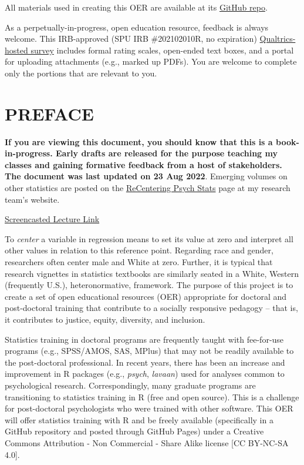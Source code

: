 \documentclass[
  11pt,
]{book}
\begin{document}
All materials used in creating this OER are available at its \href{https://github.com/lhbikos/ReCenterPsychStats}{GitHub repo}.

As a perpetually-in-progress, open education resource, feedback is always welcome. This IRB-approved (SPU IRB \#202102010R, no expiration) \href{https://spupsych.az1.qualtrics.com/jfe/form/SV_0OnBLfut3VIOIS2}{Qualtrics-hosted survey} includes formal rating scales, open-ended text boxes, and a portal for uploading attachments (e.g., marked up PDFs). You are welcome to complete only the portions that are relevant to you.

\hypertarget{preface}{%
\chapter*{PREFACE}\label{preface}}

\textbf{If you are viewing this document, you should know that this is a book-in-progress. Early drafts are released for the purpose teaching my classes and gaining formative feedback from a host of stakeholders. The document was last updated on 23 Aug 2022}. Emerging volumes on other statistics are posted on the \href{https://lhbikos.github.io/BikosRVT/ReCenter.html}{ReCentering Psych Stats} page at my research team's website.

\href{https://spu.hosted.panopto.com/Panopto/Pages/Viewer.aspx?id=c932455e-ef06-444a-bdca-acf7012d759a}{Screencasted Lecture Link}

To \emph{center} a variable in regression means to set its value at zero and interpret all other values in relation to this reference point. Regarding race and gender, researchers often center male and White at zero. Further, it is typical that research vignettes in statistics textbooks are similarly seated in a White, Western (frequently U.S.), heteronormative, framework. The purpose of this project is to create a set of open educational resources (OER) appropriate for doctoral and post-doctoral training that contribute to a socially responsive pedagogy -- that is, it contributes to justice, equity, diversity, and inclusion.

Statistics training in doctoral programs are frequently taught with fee-for-use programs (e.g., SPSS/AMOS, SAS, MPlus) that may not be readily available to the post-doctoral professional. In recent years, there has been an increase and improvement in R packages (e.g., \emph{psych}, \emph{lavaan}) used for analyses common to psychological research. Correspondingly, many graduate programs are transitioning to statistics training in R (free and open source). This is a challenge for post-doctoral psychologists who were trained with other software. This OER will offer statistics training with R and be freely available (specifically in a GitHub repository and posted through GitHub Pages) under a Creative Commons Attribution - Non Commercial - Share Alike license {[}CC BY-NC-SA 4.0{]}.
\end{document}
